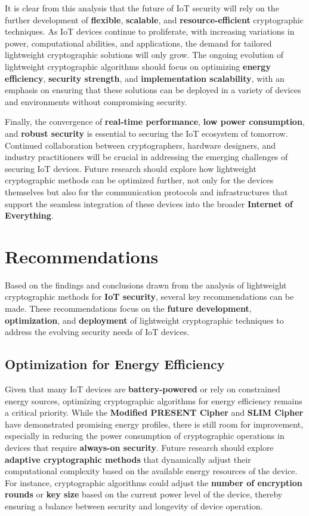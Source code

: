 \documentclass{article}
\begin{document}
It is clear from this analysis that the future of IoT security will rely on the further development of \textbf{flexible}, \textbf{scalable}, and \textbf{resource-efficient} cryptographic techniques. As IoT devices continue to proliferate, with increasing variations in power, computational abilities, and applications, the demand for tailored lightweight cryptographic solutions will only grow. The ongoing evolution of lightweight cryptographic algorithms should focus on optimizing \textbf{energy efficiency}, \textbf{security strength}, and \textbf{implementation scalability}, with an emphasis on ensuring that these solutions can be deployed in a variety of devices and environments without compromising security.

Finally, the convergence of \textbf{real-time performance}, \textbf{low power consumption}, and \textbf{robust security} is essential to securing the IoT ecosystem of tomorrow. Continued collaboration between cryptographers, hardware designers, and industry practitioners will be crucial in addressing the emerging challenges of securing IoT devices. Future research should explore how lightweight cryptographic methods can be optimized further, not only for the devices themselves but also for the communication protocols and infrastructures that support the seamless integration of these devices into the broader \textbf{Internet of Everything}.

\section{Recommendations}

Based on the findings and conclusions drawn from the analysis of lightweight cryptographic methods for \textbf{IoT security}, several key recommendations can be made. These recommendations focus on the \textbf{future development}, \textbf{optimization}, and \textbf{deployment} of lightweight cryptographic techniques to address the evolving security needs of IoT devices.

\subsection{Optimization for Energy Efficiency}

Given that many IoT devices are \textbf{battery-powered} or rely on constrained energy sources, optimizing cryptographic algorithms for energy efficiency remains a critical priority. While the \textbf{Modified PRESENT Cipher} and \textbf{SLIM Cipher} have demonstrated promising energy profiles, there is still room for improvement, especially in reducing the power consumption of cryptographic operations in devices that require \textbf{always-on security}. Future research should explore \textbf{adaptive cryptographic methods} that dynamically adjust their computational complexity based on the available energy resources of the device. For instance, cryptographic algorithms could adjust the \textbf{number of encryption rounds} or \textbf{key size} based on the current power level of the device, thereby ensuring a balance between security and longevity of device operation.
\end{document}
